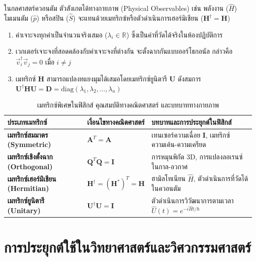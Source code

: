 \begin{maththeorem}
ในกลศาสตร์ควอนตัม ตัวสังเกตได้ทางกายภาพ (Physical Observables) เช่น พลังงาน ($\hat{H}$) โมเมนตัม ($\hat{p}$) หรือสปิน ($\hat{S}$) จะแทนด้วยเมทริกซ์หรือตัวดำเนินการเฮอร์มิเชียน ($\mathbf{H}^\dagger = \mathbf{H}$)
\begin{enumerate}
    \item ค่าเจาะจงทุกค่าเป็นจำนวนจริงเสมอ ($\lambda_i \in \mathbb{R}$) ซึ่งเป็นค่าที่วัดได้จริงในห้องปฏิบัติการ
    \item เวกเตอร์เจาะจงที่สอดคล้องกับค่าเจาะจงที่ต่างกัน จะตั้งฉากกันแบบออร์โธกอนัล กล่าวคือ $\vec{v}_i^\dagger \vec{v}_j = 0$ เมื่อ $i \neq j$
    \item เมทริกซ์ $\mathbf{H}$ สามารถแปลงทแยงมุมได้เสมอโดยเมทริกซ์ยูนิตารี $\mathbf{U}$ ดังสมการ $\mathbf{U}^\dagger \mathbf{H} \mathbf{U} = \mathbf{D} = \text{diag}(\lambda_1, \lambda_2, \dots, \lambda_n)$
\end{enumerate}
\end{maththeorem}

\begin{table}[htbp]
    \centering
    \caption{เมทริกซ์พิเศษในฟิสิกส์ คุณสมบัติทางคณิตศาสตร์ และบทบาททางกายภาพ}
    \label{tab:special_matrices_physics}
    \begin{tabularx}{\textwidth}{p{3.6cm}p{4.2cm}Y}
        \toprule
        \textbf{ประเภทเมทริกซ์} & \textbf{เงื่อนไขทางคณิตศาสตร์} & \textbf{บทบาทและการประยุกต์ในฟิสิกส์} \\
        \midrule
        \textbf{เมทริกซ์สมมาตร (Symmetric)} & $\mathbf{A}^T = \mathbf{A}$ & เทนเซอร์ความเฉื่อย $\mathbf{I}$, เมทริกซ์ความเค้น-ความเครียด \\
        \textbf{เมทริกซ์เชิงตั้งฉาก (Orthogonal)} & $\mathbf{Q}^T \mathbf{Q} = \mathbf{I}$ & การหมุนพิกัด 3D, การแปลงลอเรนซ์ในกาล-อวกาศ \\
        \textbf{เมทริกซ์เฮอร์มิเชียน (Hermitian)} & $\mathbf{H}^\dagger = (\mathbf{H}^*)^T = \mathbf{H}$ & ฮามิลโทเนียน $\hat{H}$, ตัวดำเนินการที่วัดได้ในควอนตัม \\
        \textbf{เมทริกซ์ยูนิตารี (Unitary)} & $\mathbf{U}^\dagger \mathbf{U} = \mathbf{I}$ & ตัวดำเนินการวิวัฒนาการตามเวลา $\hat{U}(t) = e^{-i\hat{H}t/\hbar}$ \\
        \bottomrule
    \end{tabularx}
\end{table}

\section{การประยุกต์ใช้ในวิทยาศาสตร์และวิศวกรรมศาสตร์}

